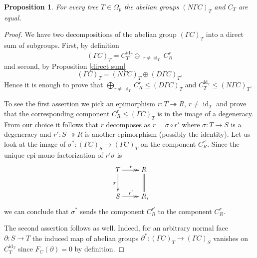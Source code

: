 \documentclass[a4paper]{amsart}
\theoremstyle{plain}
\newtheorem{prop}[thm]{Proposition}
\theoremstyle{definition}
\theoremstyle{remark}
\DeclareMathOperator{\id}{id}
\newcommand{\rpd}{\Omega_p}
\newcommand{\To}{\longrightarrow}
\numberwithin{equation}{section}
\numberwithin{figure}{section}
\begin{document}
\begin{prop}\label{counit}
    For every tree $T\in\rpd$ the abelian groups  $(N\Gamma C)_T$ and $C_T$ are equal.
\end{prop}
\begin{proof}
    We have two decompositions of the abelian group $(\Gamma C)_T$ into a direct sum of subgroups. First, by definition
    \[
        (\Gamma C)_T=C_T^{\id_T}\oplus \mathop{\bigoplus_{T\stackrel{r}{\twoheadrightarrow}R}}_{r\ne\id_T} C_R^r
    \]
    and second, by Proposition \ref{direct sum}
    \[
        (\Gamma C)_T=(N\Gamma C)_T\oplus (D\Gamma C)_T.
    \]
    Hence it is enough to prove that $\bigoplus_{r\ne\id_T} C_R^r
        \le (D\Gamma C)_T$ and $C_T^{\id_T}\le (N\Gamma C)_T$.

    To see the first assertion we pick an epimorphism $r\colon T\twoheadrightarrow R$, $r\ne \id_T$ and prove that the corresponding component $C_R^r\le (\Gamma C)_T$ is in the image of a degeneracy. From our choice it follows that $r$ decomposes as $r=\sigma\circ r'$ where $\sigma\colon T\To S$ is a degeneracy and $r'\colon S\twoheadrightarrow R$ is another epimorphism (possibly the identity). Let us look at the image of $\sigma^*\colon(\Gamma C)_S\To (\Gamma C)_T$ on the component $C_R^{r'}$. Since the unique epi-mono factorization of $r'\sigma$ is
    \[
        \xymatrix{T\ar@{>>}[r]^r\ar[d]_\sigma &R\ar@{=}[d]\\
        S\ar@{>>}[r]^{r'} &R{\rlap ,}}
    \]
    we can conclude that $\sigma^*$ sends the component $C_R^{r'}$ to the component $C_R^r$.

    The second assertion follows as well. Indeed, for an arbitrary normal face $\partial\colon S\To T$ the induced map of abelian groups $\partial^*\colon(\Gamma C)_T\To (\Gamma C)_S$ vanishes on $C_T^{\id_T}$ since $F_C(\partial)=0$ by definition.
\end{proof}
\end{document}
